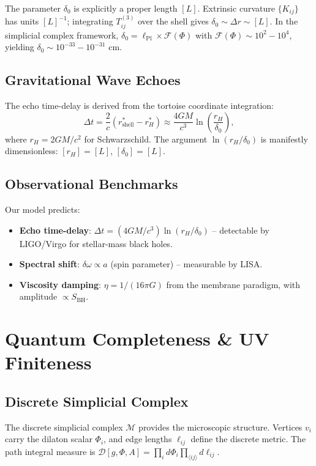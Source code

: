 \documentclass[twocolumn,prd,amsmath,amssymb]{revtex4-2}
\begin{document}
The parameter $\delta_0$ is explicitly a proper length $[L]$.  Extrinsic curvature
$\{K_{ij}\}$ has units $[L]^{-1}$; integrating $T^{(3)}_{ij}$ over the shell gives
$\delta_0 \sim \Delta r \sim [L]$.  In the simplicial complex framework,
$\delta_0 = \ell_{\text{Pl}} \times \mathcal{F}(\Phi)$ with
$\mathcal{F}(\Phi) \sim 10^{2}{-}10^{4}$, yielding $\delta_0 \sim 10^{-33}{-}10^{-31}$ cm.

\subsection{Gravitational Wave Echoes}

The echo time-delay is derived from the tortoise coordinate integration:
\begin{equation}
\Delta t = \frac{2}{c}(r^*_{\text{shell}} - r^*_H)
\approx \frac{4GM}{c^3}\ln\left(\frac{r_H}{\delta_0}\right),
\label{eq:echo}
\end{equation}
where $r_H = 2GM/c^2$ for Schwarzschild.  The argument $\ln(r_H/\delta_0)$ is manifestly
dimensionless: $[r_H] = [L]$, $[\delta_0] = [L]$.

\subsection{Observational Benchmarks}

Our model predicts:
\begin{itemize}
\item \textbf{Echo time-delay}: $\Delta t = (4GM/c^3)\ln(r_H/\delta_0)$ -- detectable by
LIGO/Virgo for stellar-mass black holes.
\item \textbf{Spectral shift}: $\delta\omega \propto a$ (spin parameter) -- measurable by LISA.
\item \textbf{Viscosity damping}: $\eta = 1/(16\pi G)$ from the membrane paradigm,
with amplitude $\propto S_{\text{BH}}$.
\end{itemize}

\section{Quantum Completeness \& UV Finiteness}
\label{sec:quantum}

\subsection{Discrete Simplicial Complex}

The discrete simplicial complex $\mathcal{M}$ provides the microscopic structure.
Vertices $v_i$ carry the dilaton scalar $\Phi_i$, and edge lengths $\ell_{ij}$ define
the discrete metric.  The path integral measure is
$\mathcal{D}[g,\Phi,A] = \prod_i d\Phi_i \prod_{\langle ij\rangle} d\ell_{ij}$.
\end{document}
